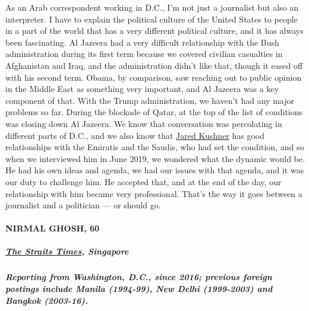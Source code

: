 As an Arab correspondent working in D.C., I'm not just a journalist but
also an interpreter. I have to explain the political culture of the
United States to people in a part of the world that has a very different
political culture, and it has always been fascinating. Al Jazeera had a
very difficult relationship with the Bush administration during its
first term because we covered civilian casualties in Afghanistan and
Iraq, and the administration didn't like that, though it eased off with
his second term. Obama, by comparison, saw reaching out to public
opinion in the Middle East as something very important, and Al Jazeera
was a key component of that. With the Trump administration, we haven't
had any major problems so far. During the blockade of Qatar, at the top
of the list of conditions was closing down Al Jazeera. We know that
conversation was percolating in different parts of D.C., and we also
know that
\href{https://www.nytimes3xbfgragh.onion/2020/03/05/us/politics/jared-kushner-cadre.html}{Jared
Kushner} has good relationships with the Emiratis and the Saudis, who
had set the condition, and so when we interviewed him in June 2019, we
wondered what the dynamic would be. He had his own ideas and agenda, we
had our issues with that agenda, and it was our duty to challenge him.
He accepted that, and at the end of the day, our relationship with him
became very professional. That's the way it goes between a journalist
and a politician --- or should go.

\hypertarget{nirmal-ghosh-60}{%
\paragraph{NIRMAL GHOSH, 60}\label{nirmal-ghosh-60}}

\hypertarget{the-straits-times-singapore}{%
\subparagraph{\texorpdfstring{\textbf{\href{https://www.straitstimes.com/authors/nirmal-ghosh}{The
Straits Times},
Singapore}}{The Straits Times, Singapore}}\label{the-straits-times-singapore}}

\hypertarget{reporting-from-washington-dc-since-2016-previous-foreign-postings-include-manila-1994-99-new-delhi-1999-2003-and-bangkok-2003-16}{%
\subparagraph{\texorpdfstring{\textbf{Reporting from Washington, D.C.,
since 2016; previous foreign postings include Manila (1994-99), New
Delhi (1999-2003) and Bangkok
(2003-16).}}{Reporting from Washington, D.C., since 2016; previous foreign postings include Manila (1994-99), New Delhi (1999-2003) and Bangkok (2003-16).}}\label{reporting-from-washington-dc-since-2016-previous-foreign-postings-include-manila-1994-99-new-delhi-1999-2003-and-bangkok-2003-16}}

